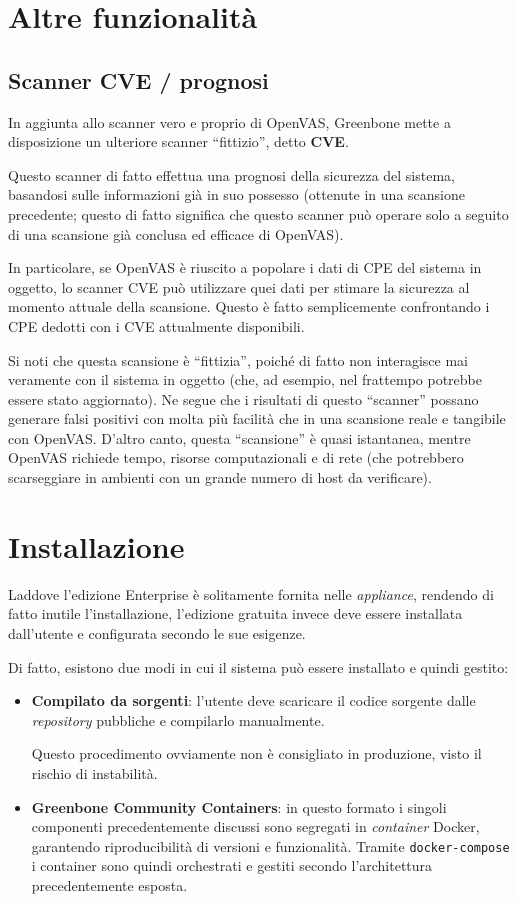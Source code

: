\section{Altre funzionalità}

\subsection{Scanner CVE / prognosi}
\label{cve}
In aggiunta allo scanner vero e proprio di OpenVAS, Greenbone mette a disposizione un ulteriore scanner ``fittizio'', detto \textbf{CVE}.

Questo scanner di fatto effettua una prognosi della sicurezza del sistema, basandosi sulle informazioni già in suo possesso (ottenute in una scansione precedente; questo di fatto significa che questo scanner può operare solo a seguito di una scansione già conclusa ed efficace di OpenVAS).

In particolare, se OpenVAS è riuscito a popolare i dati di CPE del sistema in oggetto, lo scanner CVE può utilizzare quei dati per stimare la sicurezza al momento attuale della scansione. Questo è fatto semplicemente confrontando i CPE dedotti con i CVE attualmente disponibili.

Si noti che questa scansione è ``fittizia'', poiché di fatto non interagisce mai veramente con il sistema in oggetto (che, ad esempio, nel frattempo potrebbe essere stato aggiornato). Ne segue che i risultati di questo ``scanner'' possano generare falsi positivi con molta più facilità che in una scansione reale e tangibile con OpenVAS. D'altro canto, questa ``scansione'' è quasi istantanea, mentre OpenVAS richiede tempo, risorse computazionali e di rete (che potrebbero scarseggiare in ambienti con un grande numero di host da verificare).

\section{Installazione}
Laddove l'edizione Enterprise è solitamente fornita nelle \emph{appliance}, rendendo di fatto inutile l'installazione, l'edizione gratuita invece deve essere installata dall'utente e configurata secondo le sue esigenze.

Di fatto, esistono due modi in cui il sistema può essere installato e quindi gestito:
\begin{itemize}
    \item \textbf{Compilato da sorgenti}: l'utente deve scaricare il codice sorgente dalle \emph{repository} pubbliche e compilarlo manualmente.
    
    Questo procedimento ovviamente non è consigliato in produzione, visto il rischio di instabilità.
    \item \textbf{Greenbone Community Containers}: in questo formato i singoli componenti precedentemente discussi sono segregati in \emph{container} Docker, garantendo riproducibilità di versioni e funzionalità. Tramite \texttt{docker-compose} i container sono quindi orchestrati e gestiti secondo l'architettura precedentemente esposta.
\end{itemize}

